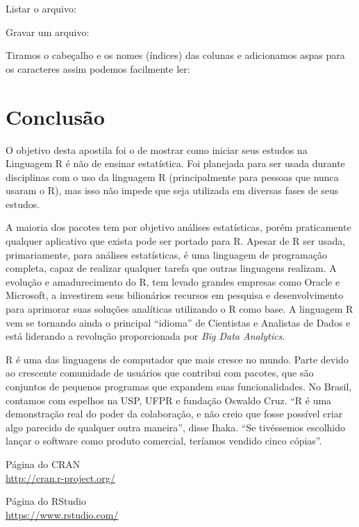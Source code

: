 \documentclass[a4paper,11pt]{article}
\begin{document}
Listar o arquivo:

Gravar um arquivo:

Tiramos o cabeçalho e os nomes (índices) das colunas e adicionamos aspas para os caracteres assim podemos facilmente ler:

\section{Conclusão}
O objetivo desta apostila foi o de mostrar como iniciar seus estudos na Linguagem R é não de ensinar estatística. Foi planejada para ser usada durante disciplinas com o uso da linguagem R (principalmente para pessoas que nunca usaram o R), mas isso não impede que seja utilizada em diversas fases de seus estudos.

A maioria dos pacotes tem por objetivo análises estatísticas, porém praticamente qualquer aplicativo que exista pode ser portado para R. Apesar de R ser usada, primariamente, para análises estatísticas, é uma linguagem de programação completa, capaz de realizar qualquer tarefa que outras linguagens realizam. A evolução e amadurecimento do R, tem levado grandes empresas como Oracle e Microsoft, a investirem seus bilionários recursos em pesquisa e desenvolvimento para aprimorar suas soluções analíticas utilizando o R como base. A linguagem R vem se tornando ainda o principal ``idioma'' de Cientistas e Analistas de Dados e está liderando a revolução proporcionada por \textit{Big Data Analytics}.

R é uma das linguagens de computador que mais cresce no mundo. Parte devido ao crescente comunidade de usuários que contribui com pacotes, que são conjuntos de pequenos programas que expandem suas funcionalidades. No Brasil, contamos com espelhos na USP, UFPR e fundação Oswaldo Cruz. ``R é uma demonstração real do poder da colaboração, e não creio que fosse possível criar algo parecido de qualquer outra maneira'', disse Ihaka. ``Se tivéssemos escolhido lançar o software como produto comercial, teríamos vendido cinco cópias''. 



\begin{thebibliography}{5}
  Página do CRAN \\
  \url{http://cran.r-project.org/}
  
  Página do RStudio \\
  \url{https://www.rstudio.com/}
  
  
\end{thebibliography}
  
\end{document}
